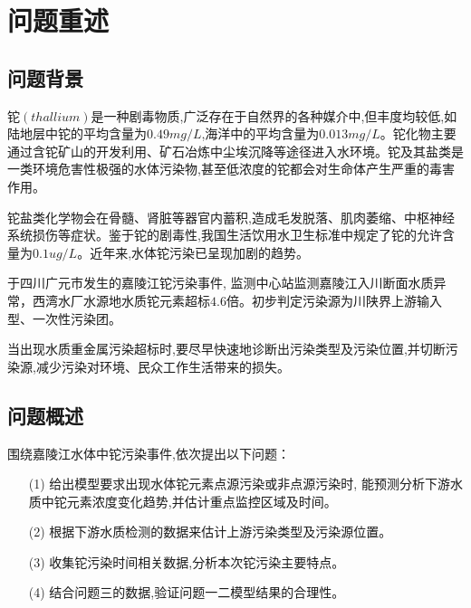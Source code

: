 \documentclass{whutmod}
\begin{document}
	\tableofcontents
	\newpage	%
	
	\section{问题重述}
	\subsection{问题背景}

	铊$(thallium)$是一种剧毒物质,广泛存在于自然界的各种媒介中,但丰度均较低,如陆地层中铊的平均含量为$0.49mg/L$,海洋中的平均含量为$0.013mg/L$。铊化物主要通过含铊矿山的开发利用、矿石冶炼中尘埃沉降等途径进入水环境。铊及其盐类是一类环境危害性极强的水体污染物,甚至低浓度的铊都会对生命体产生严重的毒害作用\parencite{liu2019treatment}。
	
	铊盐类化学物会在骨髓、肾脏等器官内蓄积,造成毛发脱落、肌肉萎缩、中枢神经系统损伤等症状。鉴于铊的剧毒性,我国生活饮用水卫生标准中规定了铊的允许含量为$0.1ug/L$。近年来,水体铊污染已呈现加剧的趋势。
	
	于四川广元市发生的嘉陵江铊污染事件, 监测中心站监测嘉陵江入川断面水质异常，西湾水厂水源地水质铊元素超标$4.6$倍。初步判定污染源为川陕界上游输入型、一次性污染团。
	
	当出现水质重金属污染超标时,要尽早快速地诊断出污染类型及污染位置,并切断污染源,减少污染对环境、民众工作生活带来的损失。
	
	\subsection{问题概述}
	
	围绕嘉陵江水体中铊污染事件,依次提出以下问题：
	
	\begin{itemize}
		\item [(1)]
		 给出模型要求出现水体铊元素点源污染或非点源污染时, 能预测分析下游水质中铊元素浓度变化趋势,并估计重点监控区域及时间。
		\item [(2)] 
		根据下游水质检测的数据来估计上游污染类型及污染源位置。
		\item [(3)] 收集铊污染时间相关数据,分析本次铊污染主要特点。
		\item [(4)] 结合问题三的数据,验证问题一二模型结果的合理性。
	\end{itemize}
	
\end{document}
